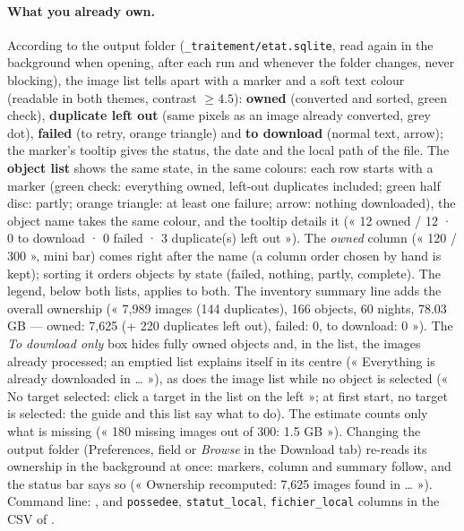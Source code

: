 \paragraph{What you already own.} According to the output folder (\texttt{\_traitement/etat.sqlite}, read again in
the background when opening, after each run and whenever the folder changes, never blocking), the image list tells
apart with a marker and a soft text colour (readable in both themes, contrast $\geq 4.5$): \textbf{owned} (converted
and sorted, green check), \textbf{duplicate left out} (same pixels as an image already converted, grey dot),
\textbf{failed} (to retry, orange triangle) and \textbf{to download} (normal text, arrow); the marker's tooltip gives
the status, the date and the local path of the file. The \textbf{object list} shows the same state, in the same
colours: each row starts with a marker (green check: everything owned, left-out duplicates included; green half disc:
partly; orange triangle: at least one failure; arrow: nothing downloaded), the object name takes the same colour, and
the tooltip details it (« 12 owned / 12 · 0 to download · 0 failed · 3 duplicate(s) left out »). The \emph{owned}
column (« 120 / 300 », mini bar) comes right after the name (a column order chosen by hand is kept); sorting it
orders objects by state (failed, nothing, partly, complete). The legend, below both lists, applies to both. The
inventory summary line adds the overall ownership (« 7,989 images (144 duplicates), 166 objects, 60 nights,
78.03 GB — owned: 7,625 (+ 220 duplicates left out), failed: 0, to download: 0 »). The \emph{To download only} box
hides fully owned objects and, in the list, the images already processed; an emptied list explains itself in its
centre (« Everything is already downloaded in … »), as does the image list while no object is selected (« No target
selected: click a target in the list on the left »; at first start, no target is selected: the guide and this list
say what to do). The estimate counts only what is missing
(« 180 missing images out of 300: 1.5 GB »). Changing the output folder (Preferences, field or \emph{Browse} in the
Download tab) re-reads its ownership in the background at once: markers, column and summary follow, and the status
bar says so (« Ownership recomputed: 7,625 images found in … »).
Command line: , and \texttt{possedee}, \texttt{statut\_local}, \texttt{fichier\_local} columns in the CSV of .

